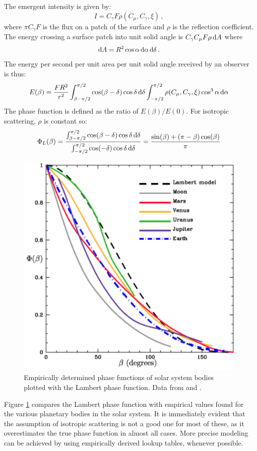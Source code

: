 The emergent intensity is given by:
\begin{equation}
I = C_\gamma F \rho(C_\mu,C_\gamma,\xi) \,,
\end{equation}
where $\pi C_\gamma F$ is the flux on a patch of the surface and $\rho$ is the reflection coefficient.  The energy crossing a surface patch into unit solid angle is $C_\gamma C_\mu F \rho \,\mathrm{d}A$ where
\begin{equation}
\mathrm{d}A = R^2 \cos\alpha \,\mathrm{d}\alpha \,\mathrm{d}\delta \,.
\end{equation}
The energy per second per unit area per unit solid angle received by an observer is thus:
\begin{equation}
E(\beta) = \frac{F R^2}{r^2} \int_{\beta - \pi/2}^{\pi/2} \cos(\beta - \delta) \cos\delta \,\mathrm{d}\delta  \int_{-\pi/2}^{\pi/2} \rho(C_\mu,C_\gamma,\xi) \cos^3 \alpha \,\mathrm{d}\alpha
\end{equation}
The phase function is defined as the ratio of $E(\beta)/E(0)$.  For isotropic scattering, $\rho$ is constant so:
\begin{equation}\label{eq:lambertPhaseFunc}
\Phi_L(\beta) = \frac{\int_{\beta - \pi/2}^{\pi/2} \cos(\beta - \delta) \cos\delta \,\mathrm{d}\delta}{ \int_{-\pi/2}^{\pi/2} \cos(-\delta) \cos\delta \,\mathrm{d}\delta} = \frac{\sin(\beta)+(\pi-\beta)\cos(\beta)}{\pi}
\end{equation}

\begin{figure}[ht]
 \center
 \includegraphics[width=4.5in]{./figures/phi_v_beta}
  \caption[Solar system planet phase functions]{ \label{fig:phi_v_beta} Empirically determined phase functions of solar system bodies plotted with the Lambert phase function.  Data from \citet{sudarsky2005} and \citet{devaucouleurs1964geometric}.}
 \end{figure}
Figure \ref{fig:phi_v_beta} compares the Lambert phase function with empirical values found for the various planetary bodies in the solar system.  It is immediately evident that the assumption of isotropic scattering is not a good one for most of these, as it overestimates the true phase function in almost all cases.  More precise modeling can be achieved by using empirically derived lookup tables, whenever possible.

